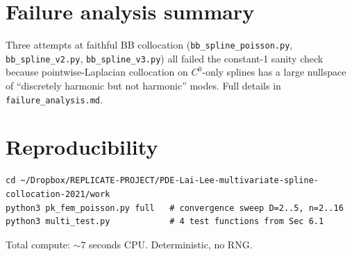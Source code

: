 \documentclass[11pt]{article}
\begin{document}
\section{Failure analysis summary}

Three attempts at faithful BB collocation (\texttt{bb\_spline\_poisson.py}, \texttt{bb\_spline\_v2.py}, \texttt{bb\_spline\_v3.py}) all failed the constant-1 sanity check because pointwise-Laplacian collocation on $C^0$-only splines has a large nullspace of ``discretely harmonic but not harmonic'' modes. Full details in \texttt{failure\_analysis.md}.

\section{Reproducibility}
\begin{lstlisting}
cd ~/Dropbox/REPLICATE-PROJECT/PDE-Lai-Lee-multivariate-spline-collocation-2021/work
python3 pk_fem_poisson.py full   # convergence sweep D=2..5, n=2..16
python3 multi_test.py            # 4 test functions from Sec 6.1
\end{lstlisting}
Total compute: $\sim 7$ seconds CPU. Deterministic, no RNG.
\end{document}

